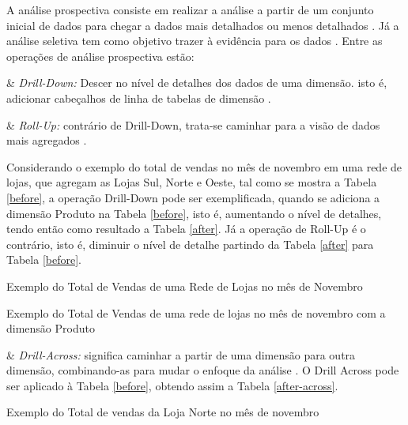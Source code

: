 A análise prospectiva consiste em realizar a análise a partir de um conjunto inicial de dados para chegar a dados mais detalhados ou menos detalhados \cite{Inmon1992}. Já a análise seletiva tem como objetivo trazer à evidência para os dados \cite{andre2000}. Entre as operações de análise prospectiva estão:

\begin{easylist}[itemize]

& \textit{Drill-Down:} Descer no nível de detalhes dos dados de uma dimensão. isto é, adicionar cabeçalhos de linha de tabelas de dimensão \cite{Kimball2002}.

& \textit{Roll-Up:} contrário de Drill-Down, trata-se caminhar para a visão de dados mais agregados . 


\end{easylist}

Considerando o exemplo do total de vendas no mês de novembro em uma rede de lojas, que agregam as Lojas Sul, Norte e Oeste, tal como se mostra a Tabela \ref{before}, a operação Drill-Down pode ser exemplificada, quando se adiciona a dimensão Produto na Tabela \ref{before}, isto é, aumentando o nível de detalhes, tendo então como resultado a Tabela \ref{after}. Já a operação de Roll-Up é o contrário, isto é, diminuir o nível de detalhe partindo da Tabela 
\ref{after} para Tabela \ref{before}.

\begin{table}[!ht]
\centering

\caption{Exemplo do Total de Vendas de uma Rede de Lojas no mês de Novembro}
\label{before}
\end{table}
\FloatBarrier


\begin{table}[!ht]
\centering

\caption{Exemplo do Total de Vendas de uma rede de lojas no mês de novembro com a dimensão Produto}
\label{after}
\end{table}

\begin{easylist}[itemize]

& \textit{Drill-Across:} significa caminhar a partir de uma dimensão para
outra dimensão, combinando-as para mudar o enfoque da
análise \cite{andre2000}. O Drill Across pode ser aplicado à Tabela \ref{before}, obtendo assim a Tabela \ref{after-across}.
\end{easylist}

\begin{table}[!ht]
\centering

\caption{Exemplo do Total de vendas da Loja Norte no mês de novembro}
\label{after-across}
\end{table}
\FloatBarrier

